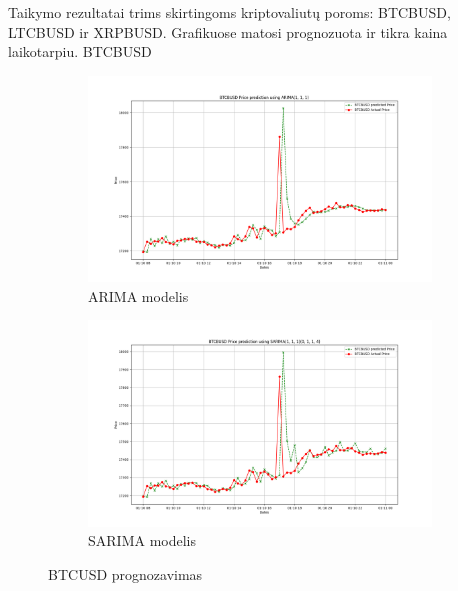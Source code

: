 \documentclass{VUMIFInfKursinis}
\begin{document}
Taikymo rezultatai trims skirtingoms kriptovaliutų poroms: BTCBUSD, LTCBUSD ir XRPBUSD. Grafikuose matosi prognozuota ir tikra kaina laikotarpiu.
BTCBUSD
\begin{figure}[H]
  \centering
  \begin{subfigure}{.5\textwidth}
    \centering
    \includegraphics[width=\linewidth]{img/BTCBUSD__ARIMA(1, 1, 1).png}
    \caption{ARIMA modelis}
    \label{fig:btcbusd_arima}
  \end{subfigure}%
  \begin{subfigure}{.5\textwidth}
    \centering
    \includegraphics[width=\linewidth]{img/BTCBUSD_seasonal_ARIMA(1, 1, 1)(0, 1, 1, 4).png}
    \caption{SARIMA modelis}
    \label{fig:btcbusd_sarima}
  \end{subfigure}
  \caption{BTCUSD prognozavimas}
  \label{fig:btcbusd}
\end{figure}
\end{document}
